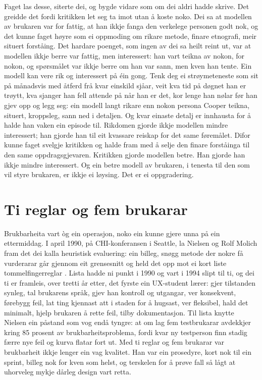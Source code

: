 Faget las desse, siterte dei, og bygde vidare som om dei aldri hadde skrive. Det greidde det fordi kritikken let seg ta imot utan å koste noko. Dei sa at modellen av brukaren var for fattig, at han ikkje fanga den verkelege personen godt nok, og det kunne faget høyre som ei oppmoding om rikare metode, finare etnografi, meir situert forståing. Det hardare poenget, som ingen av dei sa heilt reint ut, var at modellen ikkje berre var fattig, men interessert: han vart teikna av nokon, for nokon, og spørsmålet var ikkje berre om han var sann, men kven han tente. Ein modell kan vere rik og interessert på éin gong. Tenk deg ei strøymeteneste som sit på månadsvis med åtferd frå kvar einskild sjåar, veit kva tid på døgnet han er trøytt, kva sjanger han fell attende på når han er det, kor lenge han nølar før han gjev opp og legg seg: ein modell langt rikare enn nokon persona Cooper teikna, situert, kroppsleg, sann ned i detaljen. Og kvar einaste detalj er innhausta for å halde han vaken ein episode til. Rikdomen gjorde ikkje modellen mindre interessert; han gjorde han til eit kvassare reiskap for det same føremålet. Difor kunne faget svelgje kritikken og halde fram med å selje den finare forståinga til den same oppdragsgjevaren. Kritikken gjorde modellen betre. Han gjorde han ikkje mindre interessert. Og ein betre modell av brukaren, i tenesta til den som vil styre brukaren, er ikkje ei løysing. Det er ei oppgradering.

\section{Ti reglar og fem brukarar}

Brukbarheita vart òg ein operasjon, noko ein kunne gjere unna på ein ettermiddag. I april 1990, på CHI-konferansen i Seattle, la Nielsen og Rolf Molich fram det dei kalla heuristisk evaluering: ein billeg, snøgg metode der nokre få vurderarar går gjennom eit grensesnitt og held det opp mot ei kort liste tommelfingerreglar \autocite{nielsen1990heuristic}. Lista hadde ni punkt i 1990 og vart i 1994 slipt til ti, og dei ti er framleis, over tretti år etter, det fyrste ein UX-student lærer: gjer tilstanden synleg, tal brukarens språk, gjev han kontroll og utgangar, ver konsekvent, førebygg feil, lat ting kjennast att i staden for å hugsast, ver fleksibel, hald det minimalt, hjelp brukaren å rette feil, tilby dokumentasjon. Til lista knytte Nielsen ein påstand som vog endå tyngre: at om lag fem testbrukarar avdekkjer kring 85 prosent av brukbarheitsproblema, fordi kvar ny testperson finn stadig færre nye feil og kurva flatar fort ut. Med ti reglar og fem brukarar var brukbarheit ikkje lenger ein vag kvalitet. Han var ein prosedyre, kort nok til ein sprint, billeg nok for kven som helst, og terskelen for å prøve fall så lågt at uhorveleg mykje dårleg design vart retta.

